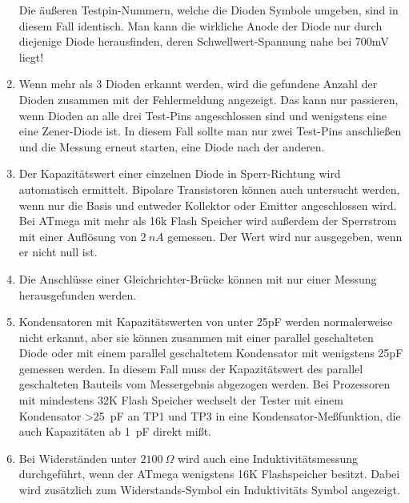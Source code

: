 \begin{enumerate}
Die äußeren Testpin-Nummern, welche die Dioden Symbole umgeben, sind in diesem Fall identisch.
Man kann die wirkliche Anode der Diode nur durch diejenige Diode herausfinden, deren Schwellwert-Spannung nahe bei 700mV liegt!
\item Wenn mehr als 3 Dioden erkannt werden, wird die gefundene Anzahl der Dioden zusammen mit der Fehlermeldung angezeigt.
Das kann nur passieren, wenn Dioden an alle drei Test-Pins angeschlossen sind und wenigstens eine eine Zener-Diode ist.
In diesem Fall sollte man nur zwei Test-Pins anschließen und die Messung erneut starten, eine Diode nach der anderen.
\item Der Kapazitätswert einer einzelnen Diode in Sperr-Richtung wird automatisch ermittelt.
Bipolare Transistoren können auch untersucht werden, wenn nur die Basis und entweder Kollektor oder Emitter angeschlossen wird.
Bei ATmega mit mehr als 16k Flash Speicher wird außerdem der Sperrstrom mit einer Auflösung von \(2~nA\) gemessen.
Der Wert wird nur ausgegeben, wenn er nicht null ist.
\item Die Anschlüsse einer Gleichrichter-Brücke können mit nur einer Messung herausgefunden werden.
\item Kondensatoren mit Kapazitätswerten von unter 25pF werden normalerweise nicht erkannt, 
aber sie können zusammen mit einer parallel geschalteten Diode oder mit einem parallel geschaltetem Kondensator mit
wenigstens 25pF gemessen werden.
In diesem Fall muss der Kapazitätswert des parallel geschalteten Bauteils vom Messergebnis abgezogen werden.
Bei Prozessoren mit mindestens 32K Flash Speicher wechselt der Tester mit einem Kondensator \textgreater 25~pF
an TP1 und TP3 in eine Kondensator-Meßfunktion, die auch Kapazitäten ab 1~pF direkt mißt.
\item Bei Widerständen unter \(2100~\Omega\) wird auch eine Induktivitätsmessung durchgeführt, wenn der
ATmega wenigstens 16K Flashspeicher besitzt.
Dabei wird zusätzlich zum Widerstands-Symbol \mbox{\electricR} ein Induktivitäts Symbol \mbox{\electricL} angezeigt.


\end{enumerate}
